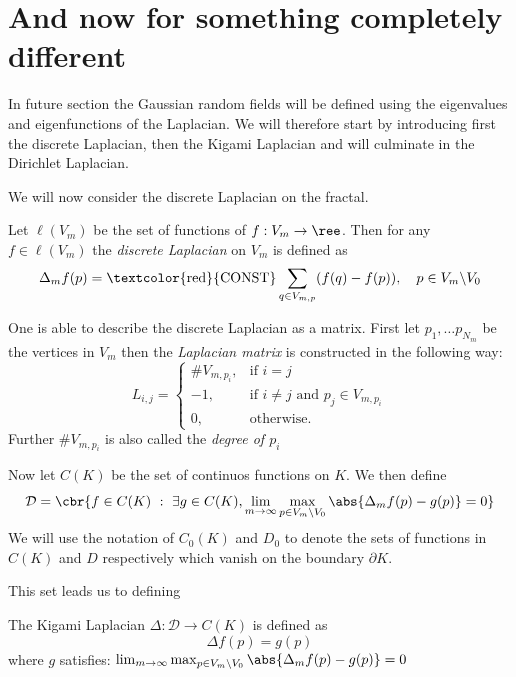 \chapter{And now for something completely different}
In future section the Gaussian random fields will be defined using the eigenvalues and eigenfunctions of the Laplacian. We will therefore start by introducing first the discrete Laplacian, then the Kigami Laplacian and will culminate in the Dirichlet Laplacian.

We will now consider the discrete Laplacian on the fractal.
\begin{defi}
	Let $\ell(V_m)$ be the set of functions of $f: V_m \to \ree$. Then for any $f \in \ell(V_m)$  the \emph{discrete Laplacian} on $V_m$ is defined as
	\begin{equation}
		\Delta_m f(p) = \text{\textcolor{red}{{CONST}}} \sum_{q \in V_{m,p}} (f(q) - f(p)), \quad p \in V_m \backslash V_0
	\end{equation}
\end{defi}

\begin{remark}\label{discreteMatrix}
	One is able to describe the discrete Laplacian as a matrix. First let $p_1, \ldots p_{N_m}$ be the vertices in $V_m$ then the \emph{Laplacian matrix} is constructed in the following way:
	\begin{equation}
		L_{i,j} = \begin{cases}
			\#V_{m,p_i}, & \text{if } i= j \\
			-1, & \text{if } i \neq j \text{ and } p_j \in V_{m,p_i} \\
			0, & \text{otherwise.}
		\end{cases}
	\end{equation}
Further $\#V_{m,p_i}$ is also called the \emph{degree of $p_i$}
\end{remark}

Now let $C(K)$ be the set of continuos functions on $K$. We then define
\begin{equation}
	\mathcal{D} = \cbr{f \in C(K) \ : \ \exists g \in C(K), \lim_{m \to \infty} \max_{p \in V_m \backslash V_0} \abs{\Delta_m f(p) - g(p)} = 0}
\end{equation}
We will use the notation of $C_0(K)$ and $D_0$ to denote the sets of functions in $C(K)$ and $D$ respectively which vanish on the boundary $\partial K$.

This set leads us to defining
\begin{defi}\label{KigamiLaplacian}
	The Kigami Laplacian $\Delta : \mathcal{D} \to C(K)$ is defined as
	\begin{equation}
		\Delta f(p) = g(p)
	\end{equation}
	where $g$ satisfies: $\lim_{m \to \infty} \max_{p \in V_m\backslash V_0}\abs{\Delta_m f(p) - g(p)} = 0$
\end{defi}

